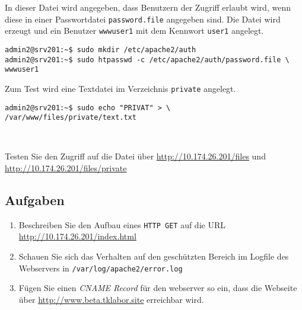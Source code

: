 In dieser Datei wird angegeben, dass Benutzern der Zugriff erlaubt wird, wenn
diese in einer Passwortdatei \texttt{password.file} angegeben sind. Die Datei
wird erzeugt und ein Benutzer \texttt{wwwuser1} mit dem Kennwort \texttt{user1}
angelegt.

\begin{lstlisting}
admin2@srv201:~$ sudo mkdir /etc/apache2/auth
admin2@srv201:~$ sudo htpasswd -c /etc/apache2/auth/password.file \
wwwuser1
\end{lstlisting}

Zum Test wird eine Textdatei im Verzeichnis \texttt{private} angelegt.

\begin{lstlisting}
admin2@srv201:~$ sudo echo "PRIVAT" > \
/var/www/files/private/text.txt
\end{lstlisting}\

Testen Sie den Zugriff auf die Datei über
\url{http://10.174.26.201/files} und \url{http://10.174.26.201/files/private}

\subsection{Aufgaben}
\begin{enumerate}
  \item Beschreiben Sie den Aufbau eines \texttt{HTTP GET} auf die URL
  \url{http://10.174.26.201/index.html}
  \item Schauen Sie sich das Verhalten auf den geschützten Bereich im Logfile
  des Webservers in \texttt{/var/log/apache2/error.log}
  \item Fügen Sie einen \textit{CNAME Record} für den webserver so ein, dass die
  Webseite über \url{http://www.beta.tklabor.site} erreichbar wird.
\end{enumerate}
